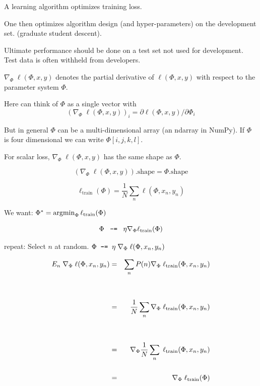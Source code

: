 {\vfill
A learning algorithm optimizes training loss.

\vfill
One then optimizes algorithm design (and hyper-parameters) on the development set. (graduate student descent).

\vfill
Ultimate performance should be done on a test set not used for development.  Test data is often withheld from developers.


$\nabla_\Phi\;\ell(\Phi,x,y)$ denotes the partial derivative of $\ell(\Phi,x,y)$ with respect to the parameter system $\Phi$.

\vfill
Here can think of $\Phi$ as a single vector with
$$(\nabla_\Phi \;\ell(\Phi,x,y))_i = \partial \ell(\Phi,x,y) /\partial \Phi_i$$

\vfill
But in general $\Phi$ can be a multi-dimensional array (an ndarray in NumPy). If $\Phi$ is four dimensional we can write $\Phi[i,j,k,l]$.

\vfill
For scalar loss, $\nabla_\Phi \;\ell(\Phi,x,y)$ has the same shape as $\Phi$.

\vfill
$$\left(\nabla_\Phi \;\ell(\Phi,x,y)\right).\mathrm{shape} = \Phi.\mathrm{shape}$$


$$\ell_{\mathrm{train}}(\Phi) = \frac{1}{N}\sum_n \ell(\Phi,x_n,y_n)$$

\vfill
\centerline{We want: \hspace{3ex} $\Phi^*  =  \operatorname*{argmin}_\Phi \ell_{\mathrm{train}}(\Phi)$}

\vfill
$$\Phi \;\;\;\mbox{\tt -=}\;\;\; \eta \nabla_\Phi \ell_\mathrm{train}(\Phi)$$


\vfill
\vfill
repeat:  Select $n$ at random. $\Phi \;\;\mbox{\tt -=}\;\; \eta \;\nabla_\Phi \; \ell(\Phi,x_n,y_n)$

\begin{eqnarray*}
  E_{n}\;\nabla_\Phi \; \ell(\Phi,x_n,y_n) & = & \sum_n P(n) \nabla_\Phi\;\ell_{\mathrm{train}}(\Phi,x_n,y_n) \\
  \\
  \\ & = & \frac{1}{N} \sum_n \nabla_\Phi\;\ell_{\mathrm{train}}(\Phi,x_n,y_n) \\
  \\
    \\ & = & \nabla_\Phi \frac{1}{N} \sum_n \;\ell_{\mathrm{train}}(\Phi,x_n,y_n) \\
  \\
  &  = & \nabla_\Phi\;\ell_{\mathrm{train}}(\Phi)
\end{eqnarray*}



}
